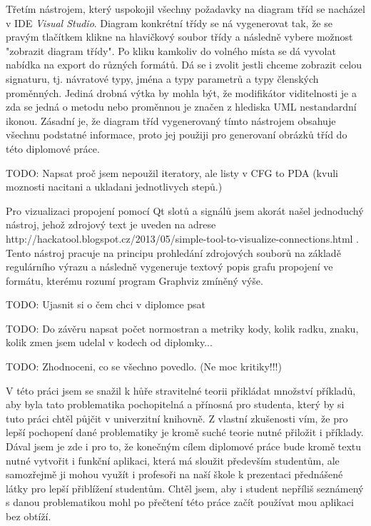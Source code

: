 
Třetím nástrojem, který uspokojil všechny požadavky na diagram tříd se nacházel v IDE \textit{Visual Studio}. Diagram konkrétní třídy se ná vygenerovat tak, že se pravým tlačítkem klikne na hlavičkový soubor třídy a následně vybere možnost "zobrazit diagram třídy". Po kliku kamkoliv do volného místa se dá vyvolat nabídka na export do různých formátů. Dá se i zvolit jestli chceme zobrazit celou signaturu, tj. návratové typy, jména a typy parametrů a typy členských proměnných. Jediná drobná výtka by mohla být, že modifikátor viditelnosti je a zda se jedná o metodu nebo proměnnou je značen z hlediska UML nestandardní ikonou. Zásadní je, že diagram tříd vygenerovaný tímto nástrojem obsahuje všechnu podstatné informace, proto jej použiji pro generovaní obrázků tříd do této diplomové práce.

TODO: Napsat proč jsem nepoužil iteratory, ale listy v CFG to PDA (kvuli moznosti nacitani a ukladani jednotlivych stepů.)


Pro vizualizaci propojení pomocí Qt slotů a signálů jsem akorát našel jednoduchý nástroj, jehož zdrojový text je uveden na adrese http://hackatool.blogspot.cz/2013/05/simple-tool-to-visualize-connections.html . Tento nástroj pracuje na principu prohledání zdrojových souborů na základě regulárního výrazu a následně vygeneruje textový popis grafu propojení ve formátu, kterému rozumí program Graphviz zmíněný výše. 



TODO: Ujasnit si o čem chci v diplomce psat

TODO: Do závěru napsat počet normostran a metriky kody, kolik radku, znaku, kolik zmen jsem udelal v kodech od diplomky...

TODO: Zhodnoceni, co se všechno povedlo. (Ne moc kritiky!!!)

V této práci jsem se snažil k hůře stravitelné teorii přikládat množství příkladů, aby byla tato problematika pochopitelná a přínosná pro studenta, který by si tuto práci chtěl půjčit v univerzitní knihovně. Z vlastní zkušenosti vím, že pro lepší pochopení dané problematiky je kromě suché teorie nutné přiložit i příklady. Dával jsem je zde i pro to, že konečným cílem diplomové práce bude kromě textu nutné vytvořit i funkční aplikaci, která má sloužit především studentům, ale samozřejmě ji mohou využít i profesoři na naší škole k prezentaci přednášené látky pro lepší přiblížení studentům. Chtěl jsem, aby i student nepříliš seznámený s danou problematikou mohl po přečtení této práce začít používat mou aplikaci bez obtíží.


